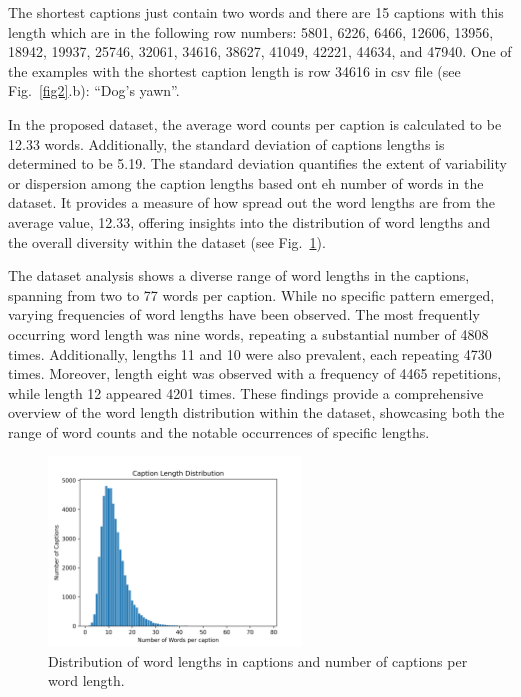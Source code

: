 \documentclass[runningheads]{llncs}
\begin{document}
The shortest captions just contain two words and there are 15 captions with this length which are in the following row numbers: 5801, 6226, 6466, 12606, 13956, 18942, 19937, 25746, 32061, 34616, 38627, 41049, 42221, 44634, and 47940. One of the examples with the shortest caption length is row 34616 in csv file (see Fig.~\ref{fig2}.b): ``Dog's yawn''.

In the proposed dataset, the average word counts per caption is calculated to be 12.33 words. Additionally, the standard deviation of captions lengths is determined to be 5.19. The standard deviation quantifies the extent of variability or dispersion among the caption lengths based ont eh number of words in the dataset. It provides a measure of how spread out the word lengths are from the average value, 12.33, offering insights into the distribution of word lengths and the overall diversity within the dataset (see Fig.~\ref{fig3}).

The dataset analysis shows a diverse range of word lengths in the captions, spanning from two to 77 words per caption. While no specific pattern emerged, varying frequencies of word lengths have been observed. The most frequently occurring word length was nine words, repeating a substantial number of 4808 times. Additionally, lengths 11 and 10 were also prevalent, each repeating 4730 times. Moreover, length eight was observed with a frequency of 4465 repetitions, while length 12 appeared 4201 times. These findings provide a comprehensive overview of the word length distribution within the dataset, showcasing both the range of word counts and the notable occurrences of specific lengths.

\begin{figure}
  \begin{center}
    \includegraphics[width=0.6\textwidth]{length_distribution.png}
    \caption{Distribution of word lengths in captions and number of captions per word length.}
    \label{fig3}
  \end{center}
\end{figure}
\vspace{-10pt}
\end{document}
